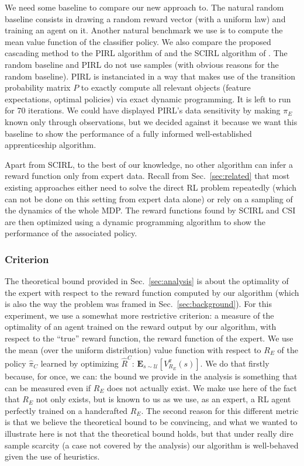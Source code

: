 \documentclass[smallextended]{svjour3}
\begin{document}
We need some baseline to compare our new approach to. The natural random baseline consists in drawing a random reward vector (with a uniform law) and training an agent on it. Another natural benchmark we use is to compute the mean value function of the classifier policy. We also compare the proposed cascading method to the PIRL algorithm of \cite{abbeel2004apprenticeship} and the SCIRL algorithm of \cite{klein2012scirl}. The random baseline and PIRL do not use samples (with obvious reasons for the random baseline). PIRL is instanciated in a way that makes use of the transition probability matrix $P$ to exactly compute all relevant objects (feature expectations, optimal policies) via exact dynamic programming. It is left to run for 70 iterations. We could have displayed PIRL's data sensitivity by making $\pi_E$ known only through observations, but we decided against it because we want this baseline to show the performance of a fully informed well-established apprenticeship algorithm.

Apart from SCIRL, to the best of our knowledge, no other algorithm can infer a reward function only from expert data. Recall from Sec.~\ref{sec:related} that most existing approaches either need to solve the direct RL problem repeatedly (which can not be done on this setting from expert data alone) or rely on a sampling of the dynamics of the whole MDP. The reward functions found by SCIRL and CSI are then optimized using a dynamic programming algorithm to show the performance of the associated policy.

\subsubsection{Criterion}
\label{subsubsec:hcriterion}
The theoretical bound provided in Sec.~\ref{sec:analysis} is about the optimality of the expert with respect to the reward function computed by our algorithm (which is also the way the problem was framed in Sec.~\ref{sec:background}). For this experiment, we use a somewhat more restrictive criterion: a measure of the optimality of an agent trained on the reward output by our algorithm, with respect to the ``true'' reward function, the reward function of the expert. We use the mean (over the uniform distribution) value function with respect to $R_E$ of the policy $\hat \pi_C$ learned by optimizing $\hat R^C$: $\mathbf{E}_{s\sim\mathcal{U}}[V^{\pi}_{R_E}(s)]$. We do that firstly because, for once, we can: the bound we provide in the analysis is something that can be measured even if $R_E$ does not actually exist. We make use here of the fact that $R_E$ not only exists, but is known to us as we use, as an expert, a RL agent perfectly trained on a handcrafted $R_E$. The second reason for this different metric is that we believe the theoretical bound to be convincing, and what we wanted to illustrate here is not that the theoretical bound holds, but that under really dire sample scarcity (a case not covered by the analysis) our algorithm is well-behaved given the use of heuristics.
\
\end{document}
